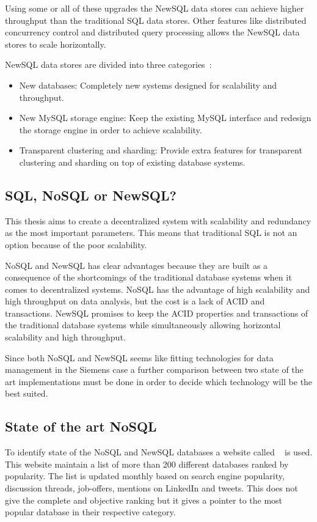 Using some or all of these upgrades the NewSQL data stores can achieve higher throughput than the traditional SQL data stores.
Other features like distributed concurrency control and distributed query processing allows the NewSQL data stores to scale horizontally.

NewSQL data stores are divided into three categories~\cite{Prasanns:NewSQLTheNewWayToHandleBigData}:

\begin{itemize}
\item New databases: Completely new systems designed for scalability and throughput.
\item New MySQL storage engine: Keep the existing MySQL interface and redesign the storage engine in order to achieve scalability.
\item Transparent clustering and sharding: Provide extra features for transparent clustering and sharding on top of existing database systems. 
\end{itemize}

\subsection{SQL, NoSQL or NewSQL?}
This thesis aims to create a decentralized system with scalability and redundancy as the most important parameters.
This means that traditional SQL is not an option because of the poor scalability.

NoSQL and NewSQL has clear advantages because they are built as a consequence of the shortcomings of the traditional database systems when it comes to decentralized systems.
NoSQL has the advantage of high scalability and high throughput on data analysis, but the cost is a lack of ACID and transactions.
NewSQL promises to keep the ACID properties and transactions of the traditional database systems while simultaneously allowing horizontal scalability and high throughput.

Since both NoSQL and NewSQL seems like fitting technologies for data management in the Siemens case a further comparison between two state of the art implementations must be done in order to decide which technology will be the best suited.

\subsection{State of the art NoSQL}
To identify state of the NoSQL and NewSQL databases a website called  ~\cite{db-engines} is used.
This website maintain a list of more than 200 different databases ranked by popularity. The list is updated monthly based on search engine popularity, discussion threads, job-offers, mentions on LinkedIn and tweets. This does not give the complete and objective ranking but it gives a pointer to the most popular database in their respective category.

